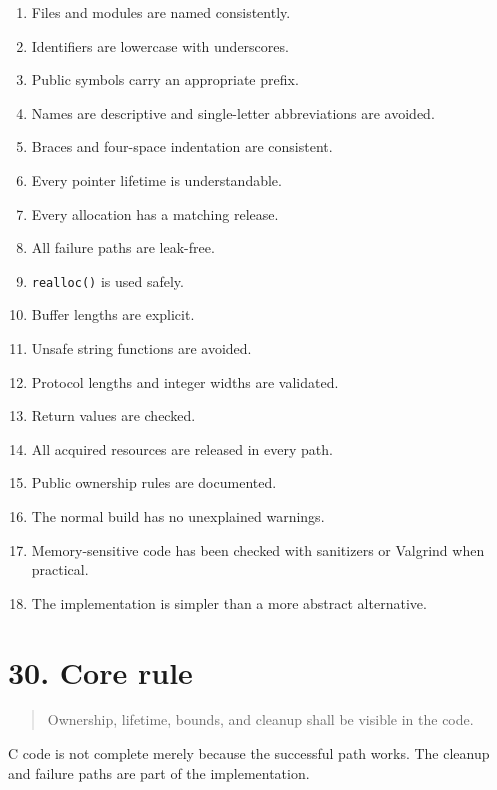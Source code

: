 \documentclass[11pt,a4paper]{article}
\begin{document}
\begin{enumerate}
\def\labelenumi{\arabic{enumi}.}
\tightlist
\item
  Files and modules are named consistently.
\item
  Identifiers are lowercase with underscores.
\item
  Public symbols carry an appropriate prefix.
\item
  Names are descriptive and single-letter abbreviations are avoided.
\item
  Braces and four-space indentation are consistent.
\item
  Every pointer lifetime is understandable.
\item
  Every allocation has a matching release.
\item
  All failure paths are leak-free.
\item
  \passthrough{\lstinline!realloc()!} is used safely.
\item
  Buffer lengths are explicit.
\item
  Unsafe string functions are avoided.
\item
  Protocol lengths and integer widths are validated.
\item
  Return values are checked.
\item
  All acquired resources are released in every path.
\item
  Public ownership rules are documented.
\item
  The normal build has no unexplained warnings.
\item
  Memory-sensitive code has been checked with sanitizers or Valgrind
  when practical.
\item
  The implementation is simpler than a more abstract alternative.
\end{enumerate}

\section{30. Core rule}\label{30-core-rule}

\begin{quote}
Ownership, lifetime, bounds, and cleanup shall be visible in the code.
\end{quote}

C code is not complete merely because the successful path works. The
cleanup and failure paths are part of the implementation.
\end{document}
